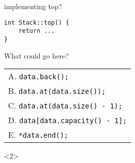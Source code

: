 \begin{comment}
\begin{frame}[fragile,label=vectorStackImplPop]{implementing pop?}
\lstset{language=C++,style=small}
\begin{lstlisting}
void Stack::pop() {
    ...
}
\end{lstlisting}
What could go here? \\
    \begin{tabular}{l}
        A. \lstinline|data.pop_front();| \\
        B. \lstinline|data.resize(data.size() - 1);| \\
        C. \lstinline|data.reserve(data.size() - 1);| \\
        D. \lstinline|data.erase(data.begin());| \\
        E. \lstinline|data.pop_back();| \\
    \end{tabular}
\begin{visibleenv}<2>
\iftoggle{heldback}{}{
\\
\myemph{B or E}
}
\end{visibleenv}
\end{frame}
\end{comment}

\begin{frame}[fragile,label=vectorStackImplTop]{implementing top?}
\lstset{language=C++,style=small}
\begin{lstlisting}
int Stack::top() {
    return ...
}
\end{lstlisting}
What could go here? \\
    \begin{tabular}{l}
        A. \lstinline|data.back();| \\
        B. \lstinline|data.at(data.size());| \\
        C. \lstinline|data.at(data.size() - 1);|\\
        D. \lstinline|data[data.capacity() - 1];| \\
        E. \lstinline|*data.end();| \\
    \end{tabular}
\begin{visibleenv}<2>
\iftoggle{heldback}{}{
\\ \myemph{A or C} \\
 or \lstinline|data[data.size() - 1]| \\ or
    \lstinline|*(data.end() - 1);|
}
\end{visibleenv}
\end{frame}
